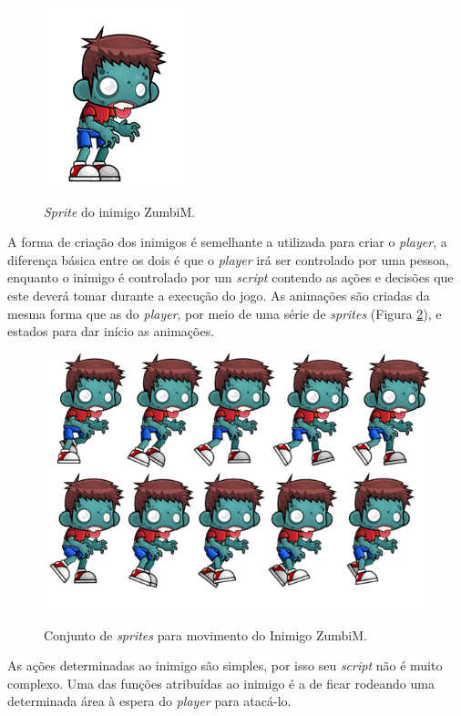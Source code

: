 \documentclass[
	12pt,				%
    oneside,			%
	a4paper,			%
	english,			%
	french,				%
	spanish,			%
	brazil,				%
	]{abntex2}
\begin{document}
				\begin{figure}[H]
					\caption{\textit{Sprite} do inimigo ZumbiM.}
					\centering
					\includegraphics[width=0.4\linewidth]{Imagens/17}
					\label{fig:17}
				\end{figure}
				
				A forma de criação dos inimigos é semelhante a utilizada para criar o \textit{player}, a diferença básica entre os dois é que o \textit{player} irá ser controlado por uma pessoa, enquanto o inimigo é controlado por um \textit{script} contendo as ações e decisões que este deverá tomar durante a execução do jogo. As animações são criadas da mesma forma que as do \textit{player}, por meio de uma série de \textit{sprites} (Figura \ref{fig:18}), e estados para dar início as animações.
				
				\begin{figure}[H]
					\caption{Conjunto de \textit{sprites} para movimento do Inimigo ZumbiM.}
					\centering
					\includegraphics[width=0.6\linewidth]{Imagens/18}
					\label{fig:18}
				\end{figure}
			
				As ações determinadas ao inimigo são simples, por isso seu \textit{script} não é muito complexo. Uma das funções atribuídas ao inimigo é a de ficar rodeando uma determinada área à espera do \textit{player} para atacá-lo.
				
\end{document}
